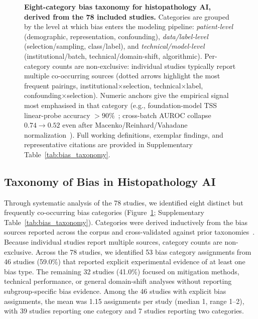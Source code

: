 \begin{figure}[!ht]
{}%
  \caption{\textbf{Eight-category bias taxonomy for histopathology AI,
           derived from the 78 included studies.}  Categories
           are grouped by the level at which bias enters the
           modeling pipeline: \emph{patient-level}
           (demographic, representation, confounding),
           \emph{data/label-level} (selection/sampling, class/label),
           and \emph{technical/model-level} (institutional/batch,
           technical/domain-shift, algorithmic).  Per-category counts
           are non-exclusive: individual studies typically report
           multiple co-occurring sources (dotted arrows highlight the
           most frequent pairings, institutional$\times$selection,
           technical$\times$label, confounding$\times$selection).
           Numeric anchors give the empirical signal most emphasised
           in that category (e.g., foundation-model TSS
           linear-probe accuracy ${>}90\%$~\citep{komen2024batch};
           cross-batch AUROC collapse $0.74\!\to\!0.52$ even after
           Macenko/Reinhard/Vahadane normalization~\citep{lin2025stain}).
           Full working definitions, exemplar findings, and
           representative citations are provided in
           Supplementary Table~\ref{tab:bias_taxonomy}.}
  \label{fig:bias_taxonomy}
\end{figure}


\subsection{Taxonomy of Bias in Histopathology AI}
\label{sec:results:taxonomy}

Through systematic analysis of the 78 studies, we identified eight
distinct but frequently co-occurring bias categories
(Figure~\ref{fig:bias_taxonomy}; Supplementary Table~\ref{tab:bias_taxonomy}).
Categories were derived inductively from the bias sources reported
across the corpus and cross-validated against prior
taxonomies~\citep{chen2023algorithmic, riccilara2022addressing,
celi2022sources}.  Because individual studies report multiple sources,
category counts are non-exclusive\label{sec:results:datasets}. Across the 78 studies, we identified 53 bias category assignments from 46 studies (59.0\%) that reported explicit experimental evidence of at least one bias type. The remaining 32 studies (41.0\%) focused on mitigation methods, technical performance, or general domain-shift analyses without reporting subgroup-specific bias evidence. Among the 46 studies with explicit bias assignments, the mean was 1.15 assignments per study (median 1, range 1--2), with 39 studies reporting one category and 7 studies reporting two categories.



